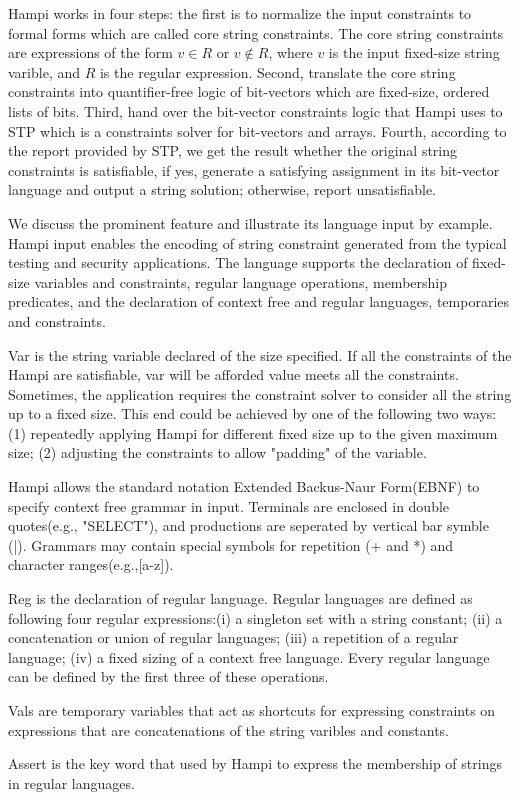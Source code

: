 Hampi works in four steps: the first is to normalize the input constraints to formal forms which are called core string constraints. The core string constraints are expressions of the form $v\in R$ or $v\notin R$, where $v$ is the input fixed-size string varible, and $R$ is the regular expression. Second, translate the core string constraints into quantifier-free logic of bit-vectors which are fixed-size, ordered lists of bits. Third, hand over the bit-vector constraints logic that Hampi uses to STP\cite{} which is a constraints solver for bit-vectors and arrays. Fourth, according to the report provided by STP, we get the result whether the original string constraints is satisfiable, if yes, generate a satisfying assignment in its bit-vector language and output a string solution; otherwise, report unsatisfiable. 

We discuss the prominent feature and illustrate its language input by example. Hampi input enables the encoding of string constraint generated from the typical testing and security applications. The language supports the declaration of fixed-size variables and constraints, regular language operations, membership predicates, and the declaration of context free and regular languages, temporaries and constraints.

Var is the string variable declared of the size specified. If all the constraints of the Hampi are satisfiable, var will be afforded value meets all the constraints. Sometimes, the application requires the constraint solver to consider all the string up to a fixed size. This end could be achieved by one of the following two ways: (1) repeatedly applying Hampi for different fixed size up to the given maximum size; (2) adjusting the constraints to allow "padding" of the variable. 

Hampi allows the standard notation Extended Backus-Naur Form(EBNF) to specify context free grammar in input. Terminals are enclosed in double quotes(e.g., "SELECT"), and productions are seperated by vertical bar symble (|). Grammars may contain special symbols for repetition (+ and *) and character ranges(e.g.,[a-z]).

Reg is the declaration of regular language. Regular languages are defined as following four regular expressions:(i) a singleton set with a string constant; (ii) a concatenation or union of regular languages; (iii) a repetition of a regular language; (iv) a fixed sizing of a context free language. Every regular language can be defined by the first three of these operations.  

Vals are temporary variables that act as shortcuts for expressing constraints on expressions that are concatenations of the string varibles and constants.

Assert is the key word that used by Hampi to express the membership of strings in regular languages.